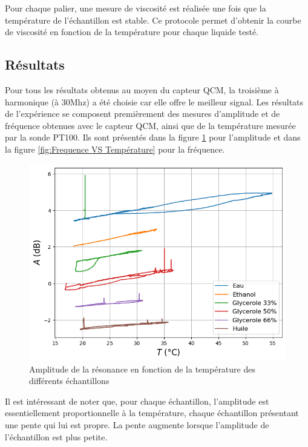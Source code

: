 Pour chaque palier, une mesure de viscosité est réalisée une fois que la température de l'échantillon est stable. Ce protocole permet d'obtenir la courbe de viscosité en fonction de la température pour chaque liquide testé.

\subsection{Résultats}

Pour tous les résultats obtenus au moyen du capteur QCM, la troisième à harmonique (à 30Mhz) a été choisie car elle offre le meilleur signal. Les résultats de l'expérience se composent premièrement des mesures d'amplitude et de fréquence obtenues avec le capteur QCM, ainsi que de la température mesurée par la sonde PT100.  
Ils sont présentés dans la figure \ref{fig:Amplitude VS Température} pour l'amplitude et dans la figure \ref{fig:Frequence VS Température} pour la fréquence.

\begin{figure}[H]
    \centering
    \includegraphics[width=\textwidth]{assets/figures/Amplitude-Temperature.png}
    \caption{Amplitude de la résonance en fonction de la température des différents échantillons}
    \label{fig:Amplitude VS Température}
\end{figure}

Il est intéressant de noter que, pour chaque échantillon, l'amplitude est essentiellement proportionnelle à la température, chaque échantillon présentant une pente qui lui est propre.  
La pente augmente lorsque l'amplitude de l'échantillon est plus petite.

